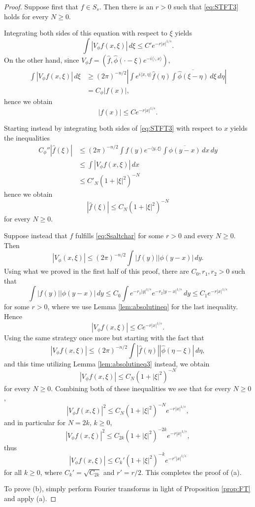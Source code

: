 \documentclass[11pt,a4paper,reqno]{amsart}
\numberwithin{equation}{section}
\theoremstyle{definition}
\theoremstyle{definition}
\begin{document}
\begin{proof}
Suppose first that $f\in S_s$. Then there is an $r>0$ such that \eqref{eq:STFT3} holds for every $N\geq 0$.

Integrating both sides of this equation with respect to $\xi$ yields
\begin{equation*}
    \int |V_\phi f(x,\xi)| \, d \xi \leq C' e^{-r|x|^{1/s}}.
\end{equation*}
On the other hand, since $V_\phi f = (\hat{f},\hat{\phi}(\cdot-\xi)e^{-i\langle \cdot, x \rangle}),$
\begin{align*}
    \int |V_\phi f(x,\xi)| \, d \xi &\geq (2\pi)^{-n/2}\left| \int e^{i\langle x,\eta\rangle} \hat{f}(\eta)  \int \overline{\hat{\phi}(\xi-\eta)}\, d \xi \, d \eta \right| \\
    &= C_\phi |f(x)|,
\end{align*}
hence we obtain $$ |f(x)| \leq C e^{-r|x|^{1/s}}.$$

Starting instead by integrating both sides of \eqref{eq:STFT3} with respect to $x$ yields the inequalities
\begin{align*}
    C_\phi'' |\hat{f}(\xi)| &\leq (2\pi)^{-n/2} \int f(y) e^{-\langle y,\xi \rangle} \int \overline{\phi(y-x)} \, d x \, d y  \\ &\leq \int |V_\phi f(x,\xi) |\, d x \\
    &\leq C'_N (1+|\xi|^2)^{-N}
\end{align*}
hence we obtain $$ |\hat{f}(\xi)|\leq C_N (1+|\xi|^2)^{-N}$$
for every $N\geq 0$.

Suppose instead that $f$ fulfills \eqref{eq:Ssaltchar} for some $r>0$ and every $N\geq 0$. Then
$$ |V_\phi (x,\xi)| \leq (2\pi)^{-n/2}\int |f(y)| |\phi(y-x)| \, d y. $$
Using what we proved in the first half of this proof, there are $C_0,r_1,r_2 > 0$ such that
$$ \int |f(y)| |\phi(y-x)| \, d y \leq C_0 \int e^{-r_1 |y|^{1/s}}e^{-r_2|y-x|^{1/s}} \, d y \leq C_1 e^{-r|x|^{1/s}} $$
for some $r>0$, where we use Lemma \ref{lem:absolutineq} for the last inequality. Hence
$$ |V_\phi f(x,\xi)| \leq C e^{-r |x|^{1/s}}. $$
Using the same strategy once more but starting with the fact that
$$ |V_\phi f (x,\xi) | \leq (2\pi)^{-n/2} \int |\hat{f}(\eta)| |\hat{\phi}(\eta - \xi)| \, d \eta, $$
and this time utilizing Lemma \ref{lem:absolutineq3} instead, we obtain
$$ |V_\phi f(x,\xi) | \leq C_N (1+|\xi|^2)^{-N} $$
for every $N\geq 0$. Combining both of these inequalities we see that for every $N\geq 0$, 
$$ |V_\phi f(x,\xi)|^2 \leq C_N (1+|\xi|^2)^{-N} e^{- r |x|^{1/s}}, $$
and in particular for $N=2k$, $k\geq 0$,
$$ |V_\phi f(x,\xi)|^2 \leq C_{2k} (1+|\xi|^2)^{-2k} e^{- r |x|^{1/s}}, $$
thus
$$ |V_\phi f(x,\xi) | \leq C_k' (1+|\xi|^2)^{-k} e^{-r' |x|^{1/s}} $$
for all $k\geq 0$, where $C_k' = \sqrt{C_{2k}}$ and $r'=r/2$. This completes the proof of (a).

To prove (b), simply perform Fourier transforms in light of Proposition \ref{prop:FT} and apply (a).
\end{proof}
\end{document}
